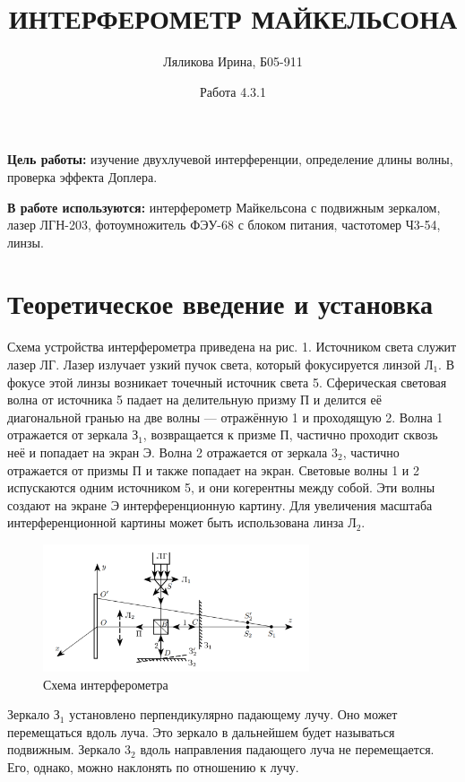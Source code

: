 \documentclass[a4paper,12pt]{article}
\title{ИНТЕРФЕРОМЕТР МАЙКЕЛЬСОНА}
\date{Работа 4.3.1}
\author{Ляликова Ирина, Б05-911}
\begin{document}
	
	\vspace{0.5 cm}
	\maketitle
	\vspace{0.5 cm}
	
	\textbf{Цель работы:} изучение двухлучевой интерференции, определение длины волны, проверка эффекта Доплера.
	
	\textbf{В работе используются:} интерферометр Майкельсона с подвижным зеркалом, лазер ЛГН-203, фотоумножитель ФЭУ-68 с блоком питания, частотомер Ч3-54, линзы.
	
	\section*{Теоретическое введение и установка}
	
	Схема устройства интерферометра приведена на рис. 1. Источником света служит лазер ЛГ. Лазер излучает узкий пучок света, который фокусируется линзой Л$_1$. В фокусе этой линзы возникает точечный источник света 5. Сферическая световая волна от источника 5 падает на делительную призму П и делится её диагональной гранью на две волны --- отражённую 1 и проходящую 2. Волна 1 отражается от зеркала З$_1$, возвращается к призме П, частично проходит сквозь неё и попадает на экран Э. Волна 2 отражается от зеркала 3$_2$, частично отражается от призмы П и также попадает на экран. Световые волны 1 и 2 испускаются одним источником 5, и они когерентны между собой. Эти волны создают на экране Э интерференционную картину. Для увеличения масштаба интерференционной картины может быть использована линза Л$_2$.
	
		\begin{figure}[h]
		\begin{center}
			\includegraphics[width = 0.7\textwidth]{424-1.png}
			\caption{Схема интерферометра}
		\end{center}
	\end{figure}
	
	Зеркало З$_1$ установлено перпендикулярно падающему лучу. Оно может перемещаться вдоль луча. Это зеркало в дальнейшем будет называться подвижным. Зеркало 3$_2$ вдоль направления падающего луча не перемещается. Его, однако, можно наклонять по отношению к лучу.
	
\end{document}

